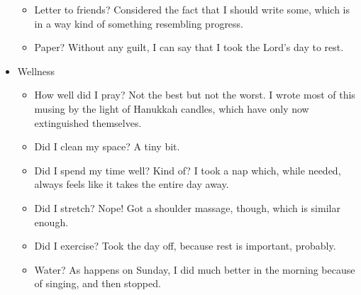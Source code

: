 \documentclass[12pt]{article}[titlepage]
\newcommand{\1}{\={a}}
\newcommand{\2}{\={e}}
\newcommand{\3}{\={\i}}
\newcommand{\4}{\=o}
\newcommand{\5}{\=u}
\newcommand{\6}{\={A}}
\renewcommand{\,}{\textsuperscript{,}}
\begin{document}
\begin{itemize}
\begin{itemize}
\item Letter to friends? Considered the fact that I should write some, which is in a way kind of something resembling progress.
\item Paper? Without any guilt, I can say that I took the Lord's day to rest.
\end{itemize}
\item Wellness
\begin{itemize}
\item How well did I pray? Not the best but not the worst. I wrote most of this musing by the light of Hanukkah candles, which have only now extinguished themselves.
\item Did I clean my space? A tiny bit.
\item Did I spend my time well? Kind of? I took a nap which, while needed, always feels like it takes the entire day away.
\item Did I stretch? Nope! Got a shoulder massage, though, which is similar enough.
\item Did I exercise? Took the day off, because rest is important, probably.
\item Water? As happens on Sunday, I did much better in the morning because of singing, and then stopped.
\end{itemize}
\end{itemize}
\end{document}
